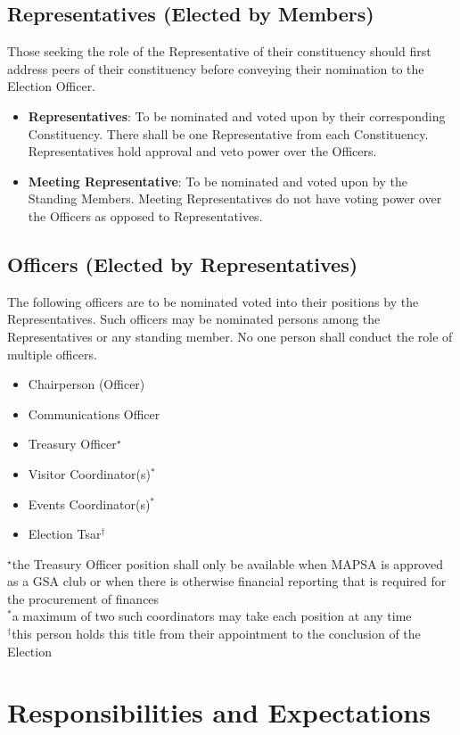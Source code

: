 \documentclass[11pt]{article}
\begin{document}
	\subsection{Representatives (Elected by Members)}
	Those seeking the role of the Representative of their constituency should first address peers of their constituency before conveying their nomination to the Election Officer. 
	\begin{itemize}
		\item \textbf{Representatives}: To be nominated and voted upon by their corresponding Constituency. There shall be one Representative from each Constituency. Representatives hold approval and veto power over the Officers.
		\item \textbf{Meeting Representative}: To be nominated and voted upon by the Standing Members. Meeting Representatives do not have voting power over the Officers as opposed to Representatives.
	\end{itemize}
	\subsection{Officers (Elected by Representatives)}
	The following officers are to be nominated voted into their positions by the Representatives. Such officers may be nominated persons among the Representatives or any standing member. No one person shall conduct the role of multiple officers.
	\begin{itemize}
		\item Chairperson (Officer)
		\item Communications Officer
		\item Treasury Officer$^\star$
		\item Visitor Coordinator(s)$^*$
		\item Events Coordinator(s)$^*$
		\item Election Tsar$^\dagger$
	\end{itemize}
	$^\star$the Treasury Officer position shall only be available when MAPSA is approved as a GSA club or when there is otherwise financial reporting that is required for the procurement of finances\\
	$^*$a maximum of two such coordinators may take each position at any time\\
	$^\dagger$this person holds this title from their appointment to the conclusion of the Election
	
	\section{Responsibilities and Expectations}
\end{document}
